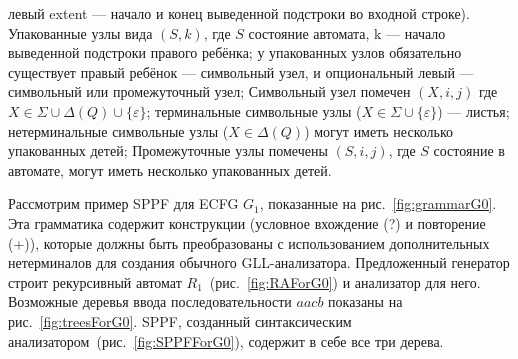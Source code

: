 \documentclass[12pt]{matmex-diploma-custom}
\begin{document}
	левый extent --- начало и конец выведенной подстроки во входной строке).
	Упакованные узлы вида $(S, k)$, где $S$ состояние автомата, k --- начало выведенной
		подстроки правого ребёнка; у упакованных узлов обязательно существует правый ребёнок ---
		символьный узел, и опциональный левый --- символьный или промежуточный узел;
	Символьный узел помечен $(X, i, j)$ где $X \in \Sigma \cup \Delta(Q) \cup \{\varepsilon\}$;
		терминальные символьные узлы ($X \in \Sigma \cup \{\varepsilon\}$) --- листья;
		нетерминальные символьные узлы ($X \in \Delta(Q)$) могут иметь несколько упакованных детей;
	Промежуточные узлы помечены $ (S, i, j) $, где $S$ состояние в автомате, могут иметь несколько упакованных детей.
	
	Рассмотрим пример SPPF для ECFG $ G_1 $, показанные на рис.~\ref{fig:grammarG0}.
	Эта грамматика содержит конструкции (условное вхождение (?) и повторение (+)),
	которые должны быть преобразованы с использованием дополнительных нетерминалов 
	для создания обычного GLL-анализатора.
	Предложенный генератор строит рекурсивный автомат $ R_1 $~(рис.~\ref{fig:RAForG0})
	и анализатор для него. Возможные деревья ввода последовательности $ aacb $ показаны 
	на рис.~\ref{fig:treesForG0}. SPPF, созданный синтаксическим анализатором~(рис.~\ref{fig:SPPFForG0}),
	содержит в себе все три дерева.
	
\end{document}
